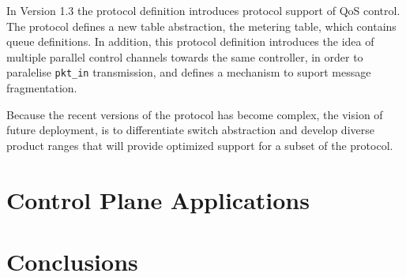In Version 1.3 the protocol definition introduces protocol support of QoS
control. The protocol defines a new table abstraction, the metering table, which
contains queue definitions. In addition, this protocol definition introduces the
idea of multiple parallel control channels towards the same controller, in order
to paralelise {\tt pkt\_in} transmission, and defines a mechanism to suport
message fragmentation.  

Because the recent versions of the protocol has become complex, the vision of
future \of deployment, is to differentiate switch abstraction and develop
diverse product ranges that will provide optimized support for a subset of the
protocol. 

\section{Control Plane Applications} \label{sec:background:ofapp}

\section{Conclusions}
